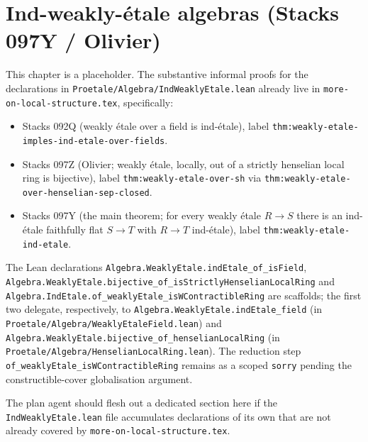 \chapter{Ind-weakly-\'etale algebras (Stacks 097Y / Olivier)}
\label{chap:ind-weakly-etale}

This chapter is a placeholder. The substantive informal proofs for the
declarations in \texttt{Proetale/Algebra/IndWeaklyEtale.lean} already live in
\texttt{more-on-local-structure.tex}, specifically:

\begin{itemize}
  \item Stacks 092Q (weakly \'etale over a field is ind-\'etale),
    label \texttt{thm:weakly-etale-imples-ind-etale-over-fields}.
  \item Stacks 097Z (Olivier; weakly \'etale, locally, out of a strictly
    henselian local ring is bijective), label
    \texttt{thm:weakly-etale-over-sh} via
    \texttt{thm:weakly-etale-over-henselian-sep-closed}.
  \item Stacks 097Y (the main theorem; for every weakly \'etale $R \to S$
    there is an ind-\'etale faithfully flat $S \to T$ with $R \to T$
    ind-\'etale), label \texttt{thm:weakly-etale-ind-etale}.
\end{itemize}

The Lean declarations
\texttt{Algebra.WeaklyEtale.indEtale\_of\_isField},
\texttt{Algebra.WeaklyEtale.bijective\_of\_isStrictlyHenselianLocalRing} and
\texttt{Algebra.IndEtale.of\_weaklyEtale\_isWContractibleRing}
are scaffolds; the first two delegate, respectively, to
\texttt{Algebra.WeaklyEtale.indEtale\_field} (in
\texttt{Proetale/Algebra/WeaklyEtaleField.lean}) and
\texttt{Algebra.WeaklyEtale.bijective\_of\_henselianLocalRing} (in
\texttt{Proetale/Algebra/HenselianLocalRing.lean}). The reduction step
\texttt{of\_weaklyEtale\_isWContractibleRing} remains as a scoped \texttt{sorry}
pending the constructible-cover globalisation argument.

The plan agent should flesh out a dedicated section here if the
\texttt{IndWeaklyEtale.lean} file accumulates declarations of its own that
are not already covered by \texttt{more-on-local-structure.tex}.
